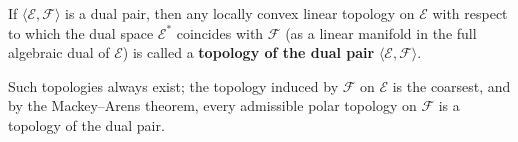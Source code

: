 If $\langle \mathcal{E}, \mathcal{F} \rangle$ is a dual pair, then any locally convex linear topology on $\mathcal{E}$ with respect to which the dual space $\mathcal{E}^*$ coincides with $\mathcal{F}$ (as a linear manifold in the full algebraic dual of $\mathcal{E}$) is called a \textbf{topology of the dual pair} $\langle \mathcal{E}, \mathcal{F} \rangle$.

Such topologies always exist; the topology induced by $\mathcal{F}$ on $\mathcal{E}$ is the coarsest, and by the Mackey–Arens theorem, every admissible polar topology on $\mathcal{F}$ is a topology of the dual pair.
